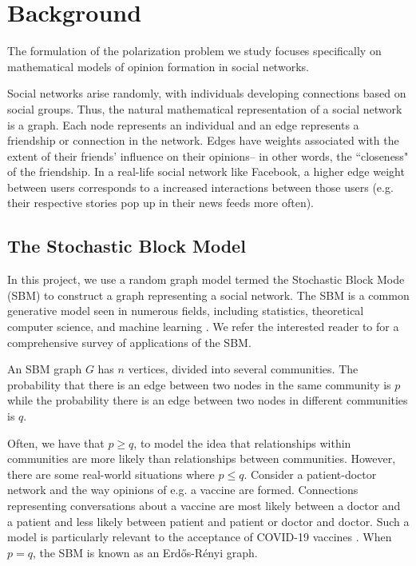 
\section{Background}
The formulation of the polarization problem we study focuses specifically on mathematical models of opinion formation in social networks. 

Social networks arise randomly, with individuals developing connections based on social groups. Thus, the natural mathematical representation of a social network is a graph. Each node represents an individual and an edge represents a friendship or connection in the network. Edges have weights associated with the extent of their friends' influence on their opinions-- in other words, the ``closeness" of the friendship. In a real-life social network like Facebook, a higher edge weight between users corresponds to a increased interactions between those users (e.g. their respective stories pop up in their news feeds more often). 

\subsection{The Stochastic Block Model}

In this project, we use a random graph model termed the Stochastic Block Mode (SBM) to construct a graph representing a social network. The SBM is a common generative model seen in numerous fields, including statistics, theoretical computer science, and machine learning \cite{sbm}. We refer the interested reader to \cite{sbm} for a comprehensive survey of applications of the SBM. 

An SBM graph $G$ has $n$ vertices, divided into several communities.
The probability that there is an edge between two nodes in the same community
is $p$ while the probability there is an edge between two nodes
in different communities is $q$.

Often, we have that $p \geq q$, to model the idea that relationships
within communities are more likely than relationships between
communities.
However, there are some real-world situations where $p \leq q$.
Consider a patient-doctor network and the way opinions of
e.g. a vaccine are formed.
Connections representing conversations about a vaccine
are most likely between a doctor and a patient and less
likely between patient and patient or doctor and doctor.
Such a model is particularly relevant to
the acceptance of COVID-19 vaccines \cite{hoff2020patient-doctor}. When $p=q$, the SBM is known as an Erdős-Rényi graph.

